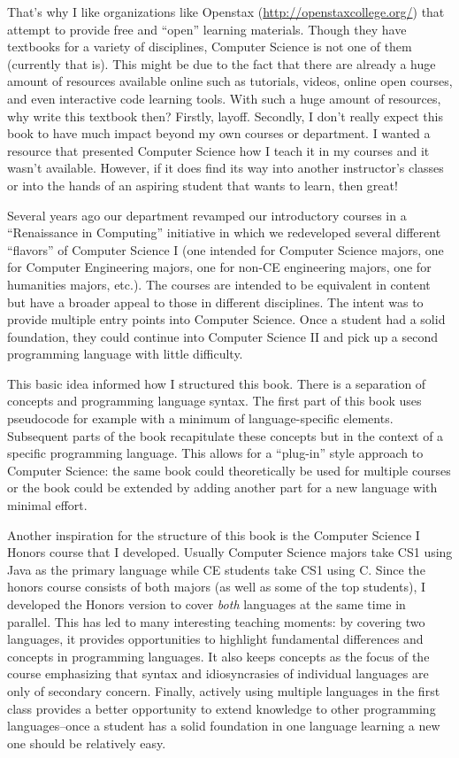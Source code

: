 That's why I like organizations like Openstax (\url{http://openstaxcollege.org/}) that attempt to provide 
free and ``open'' learning materials.  Though they have textbooks for a variety of disciplines, Computer
Science is not one of them (currently that is).  This might be due to the fact that there are already a 
huge amount of resources available online such as tutorials, videos, online open courses, and even
interactive code learning tools.  With such a huge amount of resources, why write this textbook then?  
Firstly, layoff.  Secondly, I don't really expect this book to have much impact beyond my own courses or
department.  I wanted a resource that presented Computer Science how I teach it in my courses and
it wasn't available.  However, if it does find its way into another instructor's classes or into the hands
of an aspiring student that wants to learn, then great!

Several years ago our department revamped our introductory courses in a ``Renaissance in Computing''
initiative in which we redeveloped several different ``flavors'' of Computer Science I (one intended for
Computer Science majors, one for Computer Engineering majors, one for non-CE engineering majors, 
one for humanities majors, etc.).  The courses are intended to be equivalent in content but have a 
broader appeal to those in different disciplines.  The intent was to provide multiple entry points into
Computer Science.  Once a student had a solid foundation, they could continue into Computer Science
II and pick up a second programming language with little difficulty.  

This basic idea informed how I structured this book.  There is a separation of concepts and 
programming language syntax.  The first part of this book uses pseudocode for example with a 
minimum of language-specific elements.  Subsequent parts of the book recapitulate these concepts
but in the context of a specific programming language.  This allows for a ``plug-in'' style approach
to Computer Science: the same book could theoretically be used for multiple courses or the
book could be extended by adding another part for a new language with minimal effort.

Another inspiration for the structure of this book is the Computer Science I Honors course that
I developed.  Usually Computer Science majors take CS1 using Java as the primary language
while CE students take CS1 using C.  Since the honors course consists of both majors (as well
as some of the top students), I developed the Honors version to cover \emph{both} languages
at the same time in parallel.  This has led to many interesting teaching moments: by covering
two languages, it provides opportunities to highlight fundamental differences and concepts
in programming languages.  It also keeps concepts as the focus of the course emphasizing
that syntax and idiosyncrasies of individual languages are only of secondary concern.  Finally, 
actively using multiple languages in the first class provides a better opportunity to extend 
knowledge to other programming languages--once a student has a solid foundation in one
language learning a new one should be relatively easy.  

